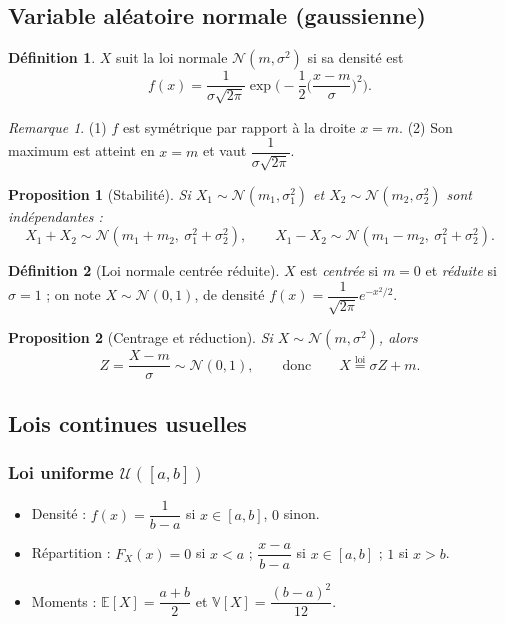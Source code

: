 \documentclass[11pt,a4paper]{article}
\newcommand{\E}{\mathbb{E}}
\newcommand{\V}{\mathbb{V}}
\newcommand{\1}{\mathbf{1}}
\theoremstyle{definition}
\newtheorem*{definition}{Définition}
\theoremstyle{plain}
\newtheorem*{proposition}{Proposition}
\theoremstyle{remark}
\newtheorem*{remarque}{Remarque}
\begin{document}
\subsection{Variable aléatoire normale (gaussienne)}

\begin{definition}
$X$ suit la loi normale $\mathcal{N}(m,\sigma^2)$ si sa densité est
\[
f(x)=\frac{1}{\sigma\sqrt{2\pi}}\exp\!\Big(-\frac12\Big(\frac{x-m}{\sigma}\Big)^{2}\Big).
\]
\end{definition}

\begin{remarque}
(1) $f$ est symétrique par rapport à la droite $x=m$.
(2) Son maximum est atteint en $x=m$ et vaut $\dfrac{1}{\sigma\sqrt{2\pi}}$.
\end{remarque}

\begin{proposition}[Stabilité]
Si $X_1\sim\mathcal{N}(m_1,\sigma_1^2)$ et $X_2\sim\mathcal{N}(m_2,\sigma_2^2)$ sont indépendantes :
\[
X_1+X_2\sim\mathcal{N}(m_1+m_2,\ \sigma_1^2+\sigma_2^2),\qquad
X_1-X_2\sim\mathcal{N}(m_1-m_2,\ \sigma_1^2+\sigma_2^2).
\]
\end{proposition}

\begin{definition}[Loi normale centrée réduite]
$X$ est \emph{centrée} si $m=0$ et \emph{réduite} si $\sigma=1$ ; on note $X\sim\mathcal{N}(0,1)$, de densité $f(x)=\dfrac{1}{\sqrt{2\pi}}e^{-x^2/2}$.
\end{definition}

\begin{proposition}[Centrage et réduction]
Si $X\sim\mathcal{N}(m,\sigma^2)$, alors
\[
Z=\frac{X-m}{\sigma}\sim\mathcal{N}(0,1),\qquad\text{donc}\qquad X\overset{\text{loi}}{=}\sigma Z+m.
\]
\end{proposition}

\subsection{Lois continues usuelles}

\subsubsection*{Loi uniforme $\mathcal{U}([a,b])$}

\begin{itemize}
  \item Densité : $f(x)=\dfrac{1}{b-a}$ si $x\in[a,b]$, $0$ sinon.
  \item Répartition : $F_X(x)=0$ si $x<a$ ; $\dfrac{x-a}{b-a}$ si $x\in[a,b]$ ; $1$ si $x>b$.
  \item Moments : $\E[X]=\dfrac{a+b}{2}$ et $\V[X]=\dfrac{(b-a)^2}{12}$.
\end{itemize}
\end{document}
